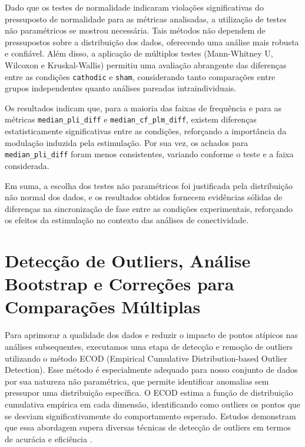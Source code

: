 Dado que os testes de normalidade indicaram violações significativas do pressuposto de normalidade para as métricas analisadas, a utilização de testes não paramétricos se mostrou necessária. Tais métodos não dependem de pressupostos sobre a distribuição dos dados, oferecendo uma análise mais robusta e confiável. Além disso, a aplicação de múltiplos testes (Mann-Whitney U, Wilcoxon e Kruskal-Wallis) permitiu uma avaliação abrangente das diferenças entre as condições \texorpdfstring{\texttt{cathodic}}{cathodic} e \texorpdfstring{\texttt{sham}}{sham}, considerando tanto comparações entre grupos independentes quanto análises pareadas intraindividuais.

Os resultados indicam que, para a maioria das faixas de frequência e para as métricas \texorpdfstring{\texttt{median\_pli\_diff}}{median_pli_diff} e \texorpdfstring{\texttt{median\_cf\_plm\_diff}}{median_cf_plm_diff}, existem diferenças estatisticamente significativas entre as condições, reforçando a importância da modulação induzida pela estimulação. Por sua vez, os achados para \texorpdfstring{\texttt{median\_pli\_diff}}{median_pli_diff} foram menos consistentes, variando conforme o teste e a faixa considerada.

Em suma, a escolha dos testes não paramétricos foi justificada pela distribuição não normal dos dados, e os resultados obtidos fornecem evidências sólidas de diferenças na sincronização de fase entre as condições experimentais, reforçando os efeitos da estimulação no contexto das análises de conectividade.

\section{Detecção de Outliers, Análise Bootstrap e Correções para Comparações Múltiplas}

Para aprimorar a qualidade dos dados e reduzir o impacto de pontos atípicos nas análises subsequentes, executamos uma etapa de detecção e remoção de outliers utilizando o método ECOD (Empirical Cumulative Distribution-based Outlier Detection). Esse método é especialmente adequado para nosso conjunto de dados por sua natureza não paramétrica, que permite identificar anomalias sem pressupor uma distribuição específica. O ECOD estima a função de distribuição cumulativa empírica em cada dimensão, identificando como outliers os pontos que se desviam significativamente do comportamento esperado. Estudos demonstram que essa abordagem supera diversas técnicas de detecção de outliers em termos de acurácia e eficiência \cite{li2022ecod}.

